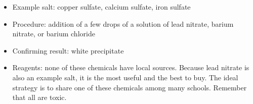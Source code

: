\begin{itemize}
\item{Example salt: copper sulfate, 
calcium sulfate, 
iron sulfate}
\item{Procedure: addition of a few drops of a solution of lead nitrate, 
barium nitrate, 
or barium chloride}
\item{Confirming result: white precipitate}
\item{Reagents: none of these chemicals have local sources. 
Because lead nitrate is also an example salt, 
it is the most useful and the best to buy. 
The ideal strategy is to share one of these chemicals among many schools. 
Remember that all are toxic.}
\end{itemize}
